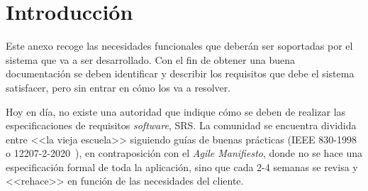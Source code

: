 
\section{Introducción}
Este anexo recoge las necesidades funcionales que deberán ser soportadas por el sistema que va a ser desarrollado. Con el fin de obtener una buena documentación se deben identificar y describir los requisitos que debe el sistema satisfacer, pero sin entrar en cómo los va a resolver.

Hoy en día, no existe una autoridad que indique cómo se deben de realizar las especificaciones de requisitos \textit{software}, SRS. La comunidad se encuentra dividida entre <<la vieja escuela>> siguiendo guías de buenas prácticas (IEEE 830-1998~\cite{720574} o 12207-2-2020~\cite{IEEE1220722020}), en contraposición con el \textit{Agile Manifiesto}, donde no se hace una especificación formal de toda la aplicación, sino que cada 2-4 semanas se revisa y <<rehace>> en función de las necesidades del cliente.

